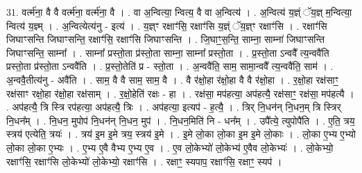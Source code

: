 \documentclass[17pt]{extarticle}
\begin{document}
31. वर्त्म॑ना॒ वै वै वर्त्म॑ना॒ वर्त्म॑ना॒ वै । . वा अ॒न्वित्या॒ न्वित्य॒ वै वा अ॒न्वित्य॑ । . अ॒न्वित्य॑ य॒ज्ञ्ं ॅय॒ज्ञ् म॒न्वित्या॒ न्वित्य॑ य॒ज्ञ्म् । . अ॒न्वित्येत्य॑नु - इत्य॑ । . य॒ज्ञ्ꣳ रक्षाꣳ॑सि॒ रक्षाꣳ॑सि य॒ज्ञ्ं ॅय॒ज्ञ्ꣳ रक्षाꣳ॑सि । . रक्षाꣳ॑सि जिघाꣳसन्ति जिघाꣳसन्ति॒ रक्षाꣳ॑सि॒ रक्षाꣳ॑सि जिघाꣳसन्ति । . जि॒घाꣳ॒॒स॒न्ति॒ साम्ना॒ साम्ना॑ जिघाꣳसन्ति जिघाꣳसन्ति॒ साम्ना᳚ । . साम्ना᳚ प्रस्तो॒ता प्र॑स्तो॒ता साम्ना॒ साम्ना᳚ प्रस्तो॒ता । . प्र॒स्तो॒ता ऽन्ववै᳚ त्य॒न्ववै॑ति प्रस्तो॒ता प्र॑स्तो॒ता ऽन्ववै॑ति । . प्र॒स्तो॒तेति॑ प्र - स्तो॒ता । . अ॒न्ववै॑ति॒ साम॒ सामा॒न्ववै᳚ त्य॒न्ववै॑ति॒ साम॑ । . अ॒न्ववै॒तीत्य॑नु - अवै॑ति । . साम॒ वै वै साम॒ साम॒ वै । . वै र॑क्षो॒हा र॑क्षो॒हा वै वै र॑क्षो॒हा । . र॒क्षो॒हा रक्ष॑साꣳ॒॒ रक्ष॑साꣳ रक्षो॒हा र॑क्षो॒हा रक्ष॑साम् । . र॒क्षो॒हेति॑ रक्षः - हा । . रक्ष॑सा॒ मप॑हत्या॒ अप॑हत्यै॒ रक्ष॑साꣳ॒॒ रक्ष॑सा॒ मप॑हत्यै । . अप॑हत्यै॒ त्रि स्त्रि रप॑हत्या॒ अप॑हत्यै॒ त्रिः । . अप॑हत्या॒ इत्यप॑ - ह॒त्यै॒ । . त्रिर् नि॒धन॑न् नि॒धन॒म् त्रि स्त्रिर् नि॒धन᳚म् । . नि॒धन॒ मुपोप॑ नि॒धन॑न् नि॒धन॒ मुप॑ । . नि॒धन॒मिति॑ नि - धन᳚म् । . उपै᳚त्ये॒ त्युपोपै॑ति । . ए॒ति॒ त्रय॒ स्त्रय॑ एत्येति॒ त्रयः॑ । . त्रय॑ इ॒म इ॒मे त्रय॒ स्त्रय॑ इ॒मे । . इ॒मे लो॒का लो॒का इ॒म इ॒मे लो॒काः । . लो॒का ए॒भ्य ए॒भ्यो लो॒का लो॒का ए॒भ्यः । . ए॒भ्य ए॒वै वैभ्य ए॒भ्य ए॒व । . ए॒व लो॒केभ्यो॑ लो॒केभ्य॑ ए॒वैव लो॒केभ्यः॑ । . लो॒केभ्यो॒ रक्षाꣳ॑सि॒ रक्षाꣳ॑सि लो॒केभ्यो॑ लो॒केभ्यो॒ रक्षाꣳ॑सि । . रक्षाꣳ॒॒ स्यपाप॒ रक्षाꣳ॑सि॒ रक्षाꣳ॒॒ स्यप॑ । \newline
\end{document}
